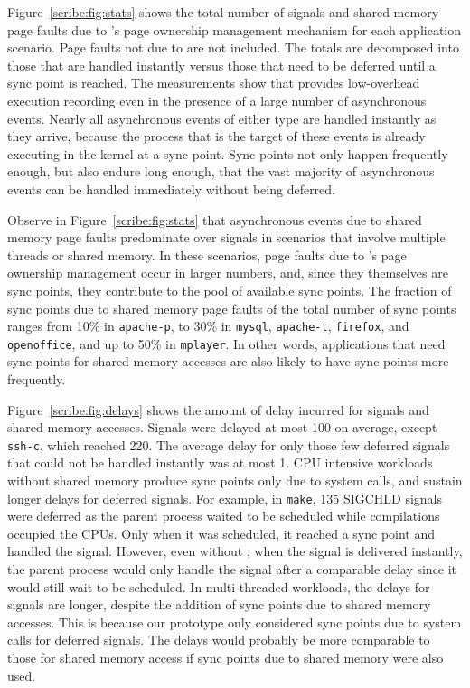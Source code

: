 Figure~\ref{scribe:fig:stats} shows the total number of signals and shared
memory page faults due to \scribe{}'s page ownership management mechanism
for each application scenario.  Page faults not due to \scribe{} are
not included.  The totals are decomposed into those that are handled
instantly versus those that need to be deferred until a sync point is
reached.  The measurements show that \scribe{} provides
low-overhead execution recording even in the presence of a large
number of asynchronous events.  
Nearly all asynchronous events of
either type are handled instantly as they arrive, because the process
that is the target of these events is already executing in the
kernel at a sync point.  Sync points not only happen frequently
enough, but also endure long enough, that the vast majority of
asynchronous events can be handled immediately without being deferred.

Observe in Figure~\ref{scribe:fig:stats} that asynchronous events due to
shared memory page faults predominate over signals in scenarios that
involve multiple threads or shared memory. In these scenarios, page
faults due to \scribe{}'s page ownership management occur in larger
numbers, and, since they themselves are sync points, they contribute
to the pool of available sync points. The fraction of sync points due
to shared memory page faults of the total number of sync points ranges
from 10\% in {\tt apache-p}, to 30\% in {\tt mysql}, {\tt apache-t},
{\tt firefox}, and {\tt openoffice}, and up to 50\% in {\tt mplayer}.
In other words, applications that need sync points for shared memory
accesses are also likely to have sync points more frequently.

Figure~\ref{scribe:fig:delays} shows the amount of delay incurred for signals
and shared memory accesses. Signals were delayed at most 100\us{}
on average, except {\tt ssh-c}, which reached 220\us{}. The average
delay for only those few deferred signals that could not be handled
instantly was at most 1\ms{}. CPU intensive workloads without shared
memory produce sync points only due to system calls, and sustain longer
delays for deferred signals.  For example, in {\tt make}, 135 SIGCHLD
signals were deferred as the parent process waited to be scheduled
while compilations occupied the CPUs. Only when it was scheduled, it
reached a sync point and handled the signal. However, even without
\scribe{}, when the signal is delivered instantly, the parent process
would only handle the signal after a comparable delay since it would
still wait to be scheduled.  In multi-threaded workloads, the
delays for signals are longer, despite the addition of sync points due
to shared memory accesses. This is because our prototype only
considered sync points due to system calls for deferred signals. The
delays would probably be more comparable to those for shared memory
access if sync points due to shared memory were also used.

